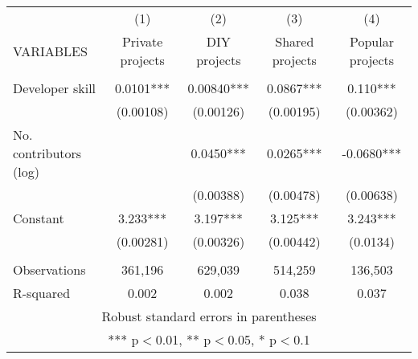 \begin{tabular}{lcccc} \hline
 & (1) & (2) & (3) & (4) \\
VARIABLES & Private projects & DIY projects & Shared projects & Popular projects \\ \hline
 &  &  &  &  \\
Developer skill & 0.0101*** & 0.00840*** & 0.0867*** & 0.110*** \\
 & (0.00108) & (0.00126) & (0.00195) & (0.00362) \\
No. contributors (log) &  & 0.0450*** & 0.0265*** & -0.0680*** \\
 &  & (0.00388) & (0.00478) & (0.00638) \\
Constant & 3.233*** & 3.197*** & 3.125*** & 3.243*** \\
 & (0.00281) & (0.00326) & (0.00442) & (0.0134) \\
 &  &  &  &  \\
Observations & 361,196 & 629,039 & 514,259 & 136,503 \\
 R-squared & 0.002 & 0.002 & 0.038 & 0.037 \\ \hline
\multicolumn{5}{c}{ Robust standard errors in parentheses} \\
\multicolumn{5}{c}{ *** p$<$0.01, ** p$<$0.05, * p$<$0.1} \\
\end{tabular}
